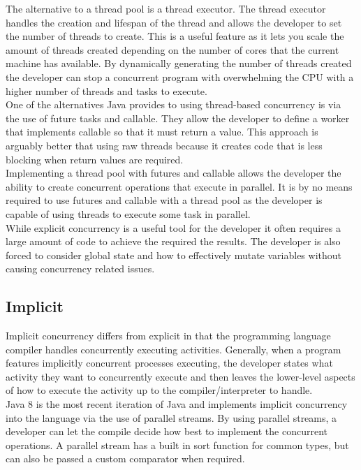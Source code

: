 \documentclass[10pt]{article}  %
\theoremstyle{definition}
\theoremstyle{remark}
\begin{document}
The alternative to a thread pool is a thread executor. The thread executor handles the creation and lifespan of the thread and allows the developer to set the number of threads to create. This is a useful feature as it lets you scale the amount of threads created depending on the number of cores that the current machine has available. By dynamically generating the number of threads created the developer can stop a concurrent program with overwhelming the CPU with a higher number of threads and tasks to execute.\\

One of the alternatives Java provides to using thread-based concurrency is via the use of future tasks and callable. They allow the developer to define a worker that implements callable so that it must return a value. This approach is arguably better that using raw threads because it creates code that is less blocking when return values are required\cite{O_F}. \\ 

Implementing a thread pool with futures and callable allows the developer the ability to create concurrent operations that execute in parallel. It is by no means required to use futures and callable with a thread pool as the developer is capable of using threads to execute some task in parallel.\\

While explicit concurrency is a useful tool for the developer it often requires a large amount of code to achieve the required the results. The developer is also forced to consider global state and how to effectively mutate variables without causing concurrency related issues.


\subsection{Implicit}\label{ss:back}

Implicit concurrency differs from explicit in that the programming language compiler  handles concurrently executing activities. Generally, when a program features implicitly concurrent processes executing, the developer states what activity they want to concurrently execute and then leaves the lower-level aspects of how to execute the activity up to the compiler/interpreter to handle.\\

Java 8 is the most recent iteration of Java and implements implicit concurrency into the language via the use of parallel streams. By using parallel streams, a developer can let the compile decide how best to implement the concurrent operations. A parallel stream has a built in sort function for common types, but can also be passed a custom comparator when required.\\
\end{document}
